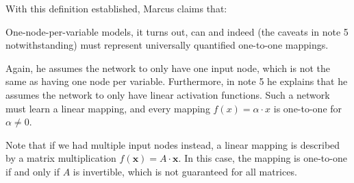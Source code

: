 \documentclass[../../main.tex]{subfiles}
\begin{document}
With this definition established, Marcus claims that:

\begin{citecallout}
    One-node-per-variable models, it turns out, can and indeed (the caveats in note 5 notwithstanding) must represent universally
    quantified one-to-one mappings.
\end{citecallout}

\begin{critique}
    Again, he assumes the network to only have one input node, which is not the same as having one node per variable. Furthermore, in note 5 he explains that he assumes the network to only have linear activation functions. Such a network must learn a linear mapping, and every mapping $f(x) = \alpha \cdot x$ is one-to-one for $\alpha \neq 0$.

    Note that if we had multiple input nodes instead, a linear mapping is described by a matrix multiplication $f(\bm{x}) = A \cdot \bm{x}$. In this case, the mapping is one-to-one if and only if $A$ is invertible, which is not guaranteed for all matrices.
\end{critique}
\end{document}
